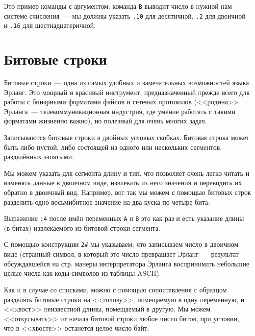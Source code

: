 \documentclass[
  paper=a4,
  fontsize=14pt,
  openany,
  appendixprefix=true
]{scrbook}
\begin{document}
Это пример команды с аргументом: команда \lstinline{B} выводит число в нужной нам системе счисления~--- мы должны указать \lstinline{.10} для десятичной, \lstinline{.2} для двоичной и \lstinline{.16} для шестнадцатеричной.

\section{Битовые строки}

Битовые строки~--- одна из самых удобных и замечательных возможностей языка Эрланг. Это мощный и красивый инструмент, предназначенный прежде всего для работы с бинарными форматами файлов и сетевых протоколов (<<родина>> Эрланга~--- телекоммуникационная индустрия, где умение работать с такими форматами жизненно важно), но полезный для очень многих задач.

Записываются битовые строки в двойных угловых скобках. Битовая строка может быть либо пустой, либо состоящей из одного или нескольких сегментов, разделённых запятыми.


Мы можем указать для сегмента длину и тип, что позволяет очень легко читать и изменять данные в двоичном виде, извлекать из него значения и переводить их обратно в двоичный вид. Например, вот так мы можем с помощью битовых строк разделить одно восьмибитное значение на два куска по четыре бита:


Выражение \lstinline{:4} после имён переменных \lstinline{A} и \lstinline{B} это как раз и есть указание длины (в битах) извлекаемого из битовой строки сегмента.

С помощью конструкции \lstinline{2#} мы указываем, что записываем число в двоичном виде (странный символ, в который это число превращает Эрланг~--- результат обсуждавшейся на стр.\pageref{strings} манеры интерпретатора Эрланга воспринимать небольшие целые числа как коды символов из таблицы ASCII).

Как и в случае со списками, можно с помощью сопоставления с образцом разделять битовые строки на <<голову>>, помещаемую в одну переменную, и <<xвост>> неизвестной длины, помещаемый в другую. Мы можем <<откусывать>> от начала битовой строки любое число битов, при условии, что в <<хвосте>> останется целое число байт:
\end{document}
